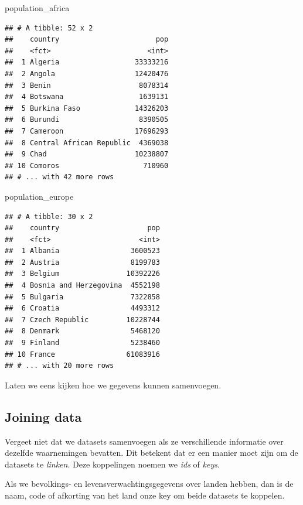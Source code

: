 \documentclass[]{tufte-book}
\newenvironment{Shaded}{}{}
\newcommand{\NormalTok}[1]{#1}
\begin{document}
\begin{Shaded}
\begin{Highlighting}[]
\NormalTok{population_africa}
\end{Highlighting}
\end{Shaded}

\begin{verbatim}
## # A tibble: 52 x 2
##    country                       pop
##    <fct>                       <int>
##  1 Algeria                  33333216
##  2 Angola                   12420476
##  3 Benin                     8078314
##  4 Botswana                  1639131
##  5 Burkina Faso             14326203
##  6 Burundi                   8390505
##  7 Cameroon                 17696293
##  8 Central African Republic  4369038
##  9 Chad                     10238807
## 10 Comoros                    710960
## # ... with 42 more rows
\end{verbatim}

\begin{Shaded}
\begin{Highlighting}[]
\NormalTok{population_europe}
\end{Highlighting}
\end{Shaded}

\begin{verbatim}
## # A tibble: 30 x 2
##    country                     pop
##    <fct>                     <int>
##  1 Albania                 3600523
##  2 Austria                 8199783
##  3 Belgium                10392226
##  4 Bosnia and Herzegovina  4552198
##  5 Bulgaria                7322858
##  6 Croatia                 4493312
##  7 Czech Republic         10228744
##  8 Denmark                 5468120
##  9 Finland                 5238460
## 10 France                 61083916
## # ... with 20 more rows
\end{verbatim}

Laten we eens kijken hoe we gegevens kunnen samenvoegen.

\hypertarget{joining-data}{%
\subsection{Joining data}\label{joining-data}}

Vergeet niet dat we datasets samenvoegen als ze verschillende informatie over dezelfde waarnemingen bevatten. Dit betekent dat er een manier moet zijn om de datasets te \emph{linken}. Deze koppelingen noemen we \emph{ids} of \emph{keys}.

Als we bevolkings- en levensverwachtingsgegevens over landen hebben, dan is de naam, code of afkorting van het land onze key om beide datasets te koppelen.
\end{document}
